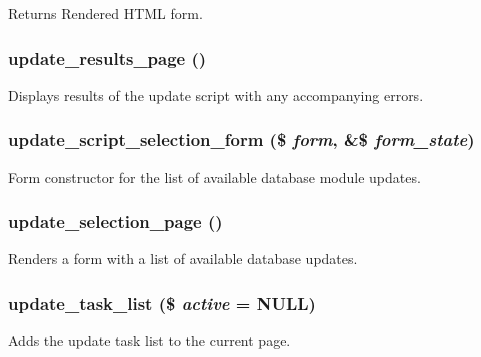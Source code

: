 \begin{DoxyReturn}{Returns}
Rendered HTML form. 
\end{DoxyReturn}
\hypertarget{update_8php_ab8c386cf40f35717b820735b5a8f7745}{
\subsubsection[{update\_\-results\_\-page}]{\setlength{\rightskip}{0pt plus 5cm}update\_\-results\_\-page ()}}
\label{update_8php_ab8c386cf40f35717b820735b5a8f7745}
Displays results of the update script with any accompanying errors. \hypertarget{update_8php_ab2eb66dd5754e2ae6a3c4828b01d619c}{
\subsubsection[{update\_\-script\_\-selection\_\-form}]{\setlength{\rightskip}{0pt plus 5cm}update\_\-script\_\-selection\_\-form (\$ {\em form}, \/  \&\$ {\em form\_\-state})}}
\label{update_8php_ab2eb66dd5754e2ae6a3c4828b01d619c}
Form constructor for the list of available database module updates. \hypertarget{update_8php_a48489df1aa5e2189ef6e7fae71de8203}{
\subsubsection[{update\_\-selection\_\-page}]{\setlength{\rightskip}{0pt plus 5cm}update\_\-selection\_\-page ()}}
\label{update_8php_a48489df1aa5e2189ef6e7fae71de8203}
Renders a form with a list of available database updates. \hypertarget{update_8php_a3563d865f4b5eb7e86e9254410438679}{
\subsubsection[{update\_\-task\_\-list}]{\setlength{\rightskip}{0pt plus 5cm}update\_\-task\_\-list (\$ {\em active} = {\ttfamily NULL})}}
\label{update_8php_a3563d865f4b5eb7e86e9254410438679}
Adds the update task list to the current page. 